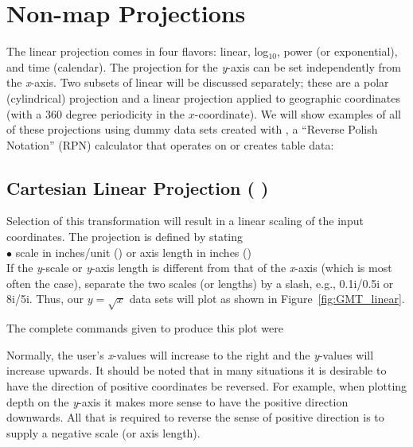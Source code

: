 %
%
\section{Non-map Projections}

The linear projection comes in four flavors: linear, log$_{10}$,
power (or exponential), and time (calendar).  The projection for the {\it y}-axis can be set
independently from the {\it x}-axis.  Two subsets of linear will be discussed
separately; these are a polar (cylindrical) projection and a linear projection applied to
geographic coordinates (with a 360 degree periodicity in the $x$-coordinate).  We will show examples
of all of these projections using dummy data sets created with
, a ``Reverse Polish Notation'' (RPN) calculator that
operates on or creates table data: 


\subsection{Cartesian Linear Projection ( )}

Selection of this transformation will result in a linear scaling
of the input coordinates.  The projection is defined by stating \\

$\bullet$ scale in inches/unit () or axis
length in inches () \\

If the {\it y}-scale or {\it y}-axis length is different from that of
the {\it x}-axis (which is most often the case), separate the two
scales (or lengths) by a slash, e.g., 0.1i/0.5i or 8i/5i. 
Thus, our $y = \sqrt{x}$ data sets will plot as shown
in Figure~\ref{fig:GMT_linear}.


The complete commands given to produce this plot were 



Normally, the user's {\it x}-values will increase to the right
and the {\it y}-values will increase upwards.  It should be noted
that in many situations it is desirable to have the direction of
positive coordinates be reversed.  For example, when plotting
depth on the {\it y}-axis it makes more sense to have the positive
direction downwards.  All that is required to reverse the sense of
positive direction is to supply a negative scale (or axis length).

